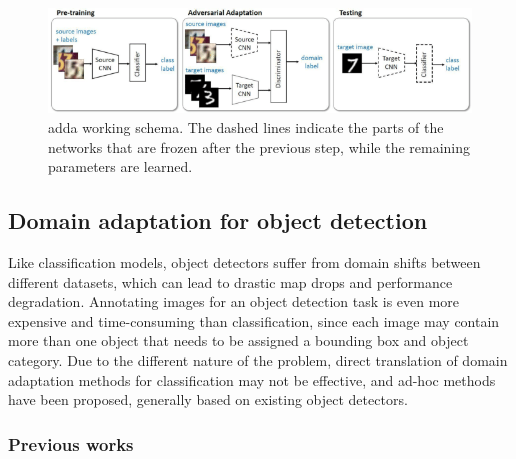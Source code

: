 \documentclass[%
    corpo=12pt,
    twoside,
    stile=classica,   
    tipotesi=magistrale,
    evenboxes,
    english,
	numerazioneromana,
]{toptesi}
\begin{document}
\begin{figure}[ht!]
	\centering
	\includegraphics[width=0.9\linewidth]{imgs/adda.png}
	\caption{\acrshort{adda} working schema\cite{tzeng2017adversarial}. The dashed lines indicate the parts of the networks that are frozen after the previous step, while the remaining parameters are learned.}
	\label{fig:adda}
\end{figure}

\subsection{Domain adaptation for object detection}
Like classification models, object detectors suffer from domain shifts between different datasets, which can lead to drastic \gls{map} drops and performance degradation. Annotating images for an object detection task is even more expensive and time-consuming than classification, since each image may contain more than one object that needs to be assigned a bounding box and object category. Due to the different nature of the problem, direct translation of domain adaptation methods for classification may not be effective, and ad-hoc methods have been proposed, generally based on existing object detectors.

\subsubsection{Previous works}
\end{document}
